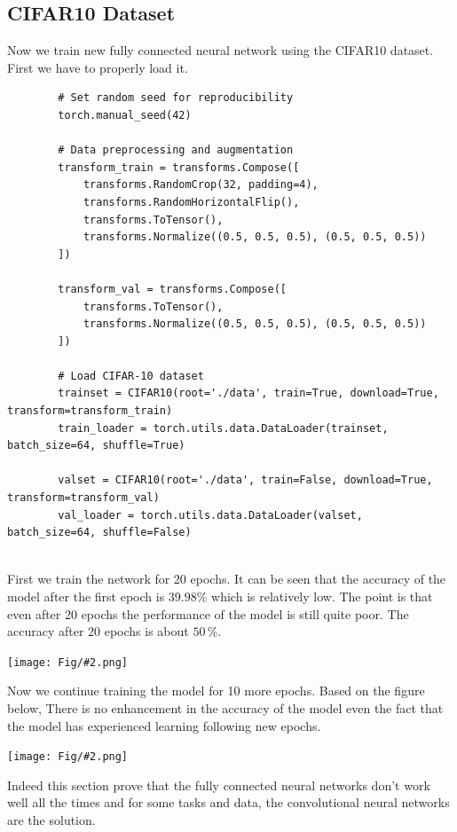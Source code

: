 \documentclass[]{article}
\newcommand{\pict}[2]{\begin{center}
		\texttt{[image: Fig/\#2.png]}
\end{center}}
\begin{document}
	\subsection*{CIFAR10 Dataset}
	Now we train new fully connected neural network using the CIFAR10 dataset. First we have to properly load it.
	\begin{lstlisting}
		# Set random seed for reproducibility
		torch.manual_seed(42)
		
		# Data preprocessing and augmentation
		transform_train = transforms.Compose([
			transforms.RandomCrop(32, padding=4),
			transforms.RandomHorizontalFlip(),
			transforms.ToTensor(),
			transforms.Normalize((0.5, 0.5, 0.5), (0.5, 0.5, 0.5))
		])
		
		transform_val = transforms.Compose([
			transforms.ToTensor(),
			transforms.Normalize((0.5, 0.5, 0.5), (0.5, 0.5, 0.5))
		])
		
		# Load CIFAR-10 dataset
		trainset = CIFAR10(root='./data', train=True, download=True, transform=transform_train)
		train_loader = torch.utils.data.DataLoader(trainset, batch_size=64, shuffle=True)
		
		valset = CIFAR10(root='./data', train=False, download=True, transform=transform_val)
		val_loader = torch.utils.data.DataLoader(valset, batch_size=64, shuffle=False)
		
	\end{lstlisting}
	First we train the network for 20 epochs. It can be seen that the accuracy of the model after the first epoch is $39.98 \%$ which is relatively low. The point is that even after 20 epochs the performance of the model is still quite poor. The accuracy after 20 epochs is about $50 \, \%$.
	\pict{0.5}{F7}
	Now we continue training the model for 10 more epochs. Based on the figure below, There is no enhancement in the accuracy of the model even the fact that the model has experienced learning following new epochs.
	\pict{0.5}{F8}
	Indeed this section prove that the fully connected neural networks don't work well all the times and for some tasks and data, the convolutional neural networks are the solution.
	
	\newpage
\end{document}
